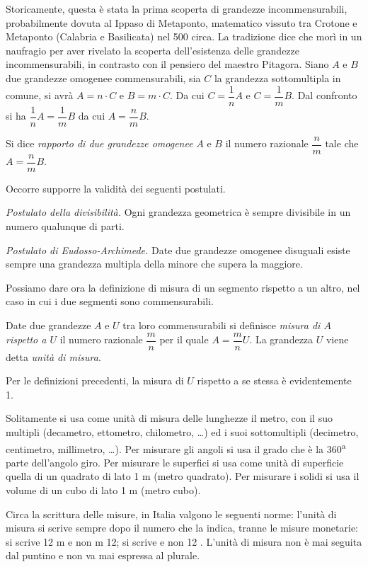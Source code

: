 Storicamente, questa è stata la prima scoperta di grandezze incommensurabili, probabilmente dovuta al Ippaso di Metaponto, matematico vissuto tra Crotone e Metaponto (Calabria e Basilicata) nel 500 \aC circa. La tradizione dice che morì in un naufragio per aver rivelato la scoperta dell'esistenza delle grandezze incommensurabili, in contrasto con il pensiero del maestro Pitagora.
Siano $A$ e $B$ due grandezze omogenee commensurabili, sia $C$ la grandezza sottomultipla in comune, si avrà $A=n\cdot C$ e $B=m\cdot C$. Da cui $C=\dfrac{1}{n}A$ e $C=\dfrac{1}{m}B$. Dal confronto si ha $\dfrac{1}{n}A=\dfrac{1}{m}B$ da cui $A=\dfrac{n}{m}B$.

\begin{definizione}
Si dice \emph{rapporto di due grandezze omogenee} $A$ e $B$ il numero razionale $\dfrac{n}{m}$ tale che $A=\dfrac{n}{m}B$.
\end{definizione}
Occorre supporre la validità dei seguenti postulati.

\noindent \emph{Postulato della divisibilità.} Ogni grandezza geometrica è sempre divisibile in un numero qualunque di parti.

\noindent \emph{Postulato di Eudosso-Archimede.} Date due grandezze omogenee disuguali esiste sempre una grandezza multipla della minore che supera la maggiore.

Possiamo dare ora la definizione di misura di un segmento rispetto a un altro, nel caso in cui i due segmenti sono commensurabili.
\begin{definizione}
Date due grandezze $A$ e $U$ tra loro commensurabili si definisce \emph{misura di $A$ rispetto a $U$} il numero razionale $\dfrac{m}{n}$ per il quale $A=\dfrac{m}{n}U$. La grandezza $U$ viene detta \emph{unità di misura}.
\end{definizione}

Per le definizioni precedenti, la misura di $U$ rispetto a se stessa è evidentemente 1.

Solitamente si usa come unità di misura delle lunghezze il metro, con il suo multipli (decametro, ettometro, chilometro, \ldots{}) ed i suoi sottomultipli (decimetro, centimetro, millimetro, \ldots{}). Per misurare gli angoli si usa il grado che è la 360\textsuperscript{a} parte dell'angolo giro. Per misurare le superfici si usa come unità di superficie quella di un quadrato di lato 1 m (metro quadrato). Per misurare i solidi si usa il volume di un cubo di lato 1 m (metro cubo).

Circa la scrittura delle misure, in Italia valgono le seguenti norme: l'unità di misura si scrive sempre dopo il numero che la indica, tranne le misure monetarie: si scrive 12 m e non m 12; si scrive  e non 12 \officialeuro. L'unità di misura non è mai seguita dal puntino e non va mai espressa al plurale.


